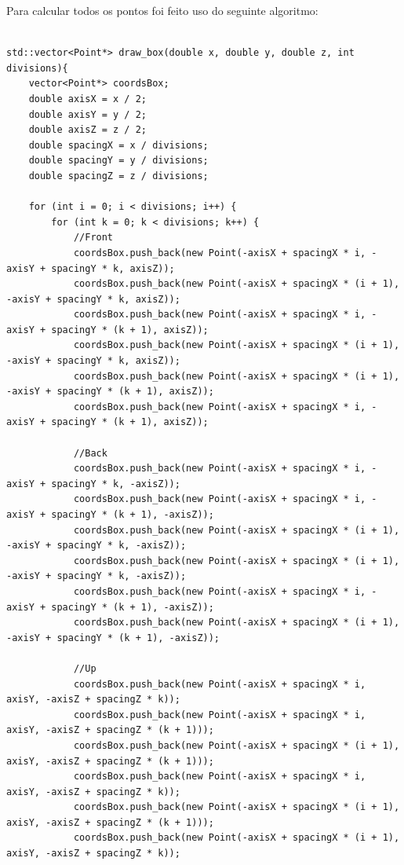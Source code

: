 \documentclass[a4paper]{article}
\begin{document}
Para calcular todos os pontos foi feito uso do seguinte algoritmo:\\
\\
\begin{lstlisting}
std::vector<Point*> draw_box(double x, double y, double z, int divisions){
    vector<Point*> coordsBox;
    double axisX = x / 2;
    double axisY = y / 2;
    double axisZ = z / 2;
    double spacingX = x / divisions;
    double spacingY = y / divisions;
    double spacingZ = z / divisions;

    for (int i = 0; i < divisions; i++) {
        for (int k = 0; k < divisions; k++) {
            //Front
            coordsBox.push_back(new Point(-axisX + spacingX * i, -axisY + spacingY * k, axisZ));
            coordsBox.push_back(new Point(-axisX + spacingX * (i + 1), -axisY + spacingY * k, axisZ));
            coordsBox.push_back(new Point(-axisX + spacingX * i, -axisY + spacingY * (k + 1), axisZ));
            coordsBox.push_back(new Point(-axisX + spacingX * (i + 1), -axisY + spacingY * k, axisZ));
            coordsBox.push_back(new Point(-axisX + spacingX * (i + 1), -axisY + spacingY * (k + 1), axisZ));
            coordsBox.push_back(new Point(-axisX + spacingX * i, -axisY + spacingY * (k + 1), axisZ));

            //Back
            coordsBox.push_back(new Point(-axisX + spacingX * i, -axisY + spacingY * k, -axisZ));
            coordsBox.push_back(new Point(-axisX + spacingX * i, -axisY + spacingY * (k + 1), -axisZ));
            coordsBox.push_back(new Point(-axisX + spacingX * (i + 1), -axisY + spacingY * k, -axisZ));
            coordsBox.push_back(new Point(-axisX + spacingX * (i + 1), -axisY + spacingY * k, -axisZ));
            coordsBox.push_back(new Point(-axisX + spacingX * i, -axisY + spacingY * (k + 1), -axisZ));
            coordsBox.push_back(new Point(-axisX + spacingX * (i + 1), -axisY + spacingY * (k + 1), -axisZ));

            //Up
            coordsBox.push_back(new Point(-axisX + spacingX * i, axisY, -axisZ + spacingZ * k));
            coordsBox.push_back(new Point(-axisX + spacingX * i, axisY, -axisZ + spacingZ * (k + 1)));
            coordsBox.push_back(new Point(-axisX + spacingX * (i + 1), axisY, -axisZ + spacingZ * (k + 1)));
            coordsBox.push_back(new Point(-axisX + spacingX * i, axisY, -axisZ + spacingZ * k));
            coordsBox.push_back(new Point(-axisX + spacingX * (i + 1), axisY, -axisZ + spacingZ * (k + 1)));
            coordsBox.push_back(new Point(-axisX + spacingX * (i + 1), axisY, -axisZ + spacingZ * k));


\end{lstlisting}
\end{document}
